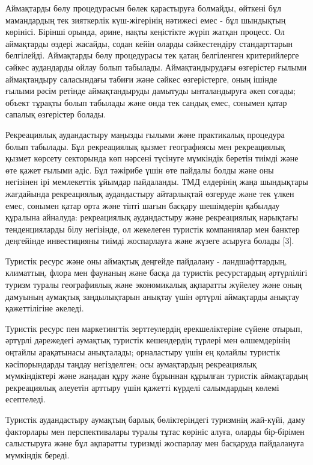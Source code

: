 \begin{multicols}{2}
Аймақтарды бөлу процедурасын бөлек қарастыруға болмайды, өйткені бұл
мамандардың тек зияткерлік күш-жігерінің нәтижесі емес - бұл шындықтың
көрінісі. Бірінші орында, әрине, нақты кеңістікте жүріп жатқан процесс.
Ол аймақтарды өздері жасайды, содан кейін оларды сәйкестендіру
стандарттарын белгілейді. Аймақтарды бөлу процедурасы тек қатаң
белгіленген критерийлерге сәйкес аудандарды ойлау болып табылады.
Аймақтандырудағы өзгерістер ғылыми аймақтандыру саласындағы табиғи және
сәйкес өзгерістерге, оның ішінде ғылыми рәсім ретінде аймақтандыруды
дамытуды ынталандыруға әкеп соғады; объект тұрақты болып табылады және
онда тек сандық емес, сонымен қатар сапалық өзгерістер болады.

Рекреациялық аудандастыру маңызды ғылыми және практикалық процедура
болып табылады. Бұл рекреациялық қызмет географиясы мен рекреациялық
қызмет көрсету секторында көп нәрсені түсінуге мүмкіндік беретін тиімді
және өте қажет ғылыми әдіс. Бұл тәжірибе үшін өте пайдалы болды және оны
негізінен ірі мемлекеттік ұйымдар пайдаланды. ТМД елдерінің жаңа
шындықтары жағдайында рекреациялық аудандастыру айтарлықтай өзгеруде
және тек үлкен емес, сонымен қатар орта және тіпті шағын басқару
шешімдерін қабылдау құралына айналуда: рекреациялық аудандастыру және
рекреациялық нарықтағы тенденцияларды білу негізінде, ол жекелеген
туристік компаниялар мен банктер деңгейінде инвестицияны тиімді
жоспарлауға және жүзеге асыруға болады {[}3{]}.

Туристік ресурс және оны аймақтық деңгейде пайдалану - ландшафттардың,
климаттың, флора мен фаунаның және басқа да туристік ресурстардың
әртүрлілігі туризм туралы географиялық және экономикалық ақпаратты
жүйелеу және оның дамуының аумақтық заңдылықтарын анықтау үшін әртүрлі
аймақтарды анықтау қажеттілігіне әкеледі.

Туристік ресурс пен маркетингтік зерттеулердің ерекшеліктеріне сүйене
отырып, әртүрлі дәрежедегі аумақтық туристік кешендердің түрлері мен
өлшемдерінің оңтайлы арақатынасы анықталады; орналастыру үшін ең қолайлы
туристік кәсіпорындарды таңдау негізделген; осы аумақтардың рекреациялық
мүмкіндіктері және жаңадан құру және бұрыннан құрылған туристік
аймақтардың рекреациялық әлеуетін арттыру үшін қажетті күрделі
салымдардың көлемі есептеледі.

Туристік аудандастыру аумақтың барлық бөліктеріндегі туризмнің жай-күйі,
даму факторлары мен перспективалары туралы тұтас көрініс алуға, оларды
бір-бірімен салыстыруға және бұл ақпаратты туризмді жоспарлау мен
басқаруда пайдалануға мүмкіндік береді.


\end{multicols}
